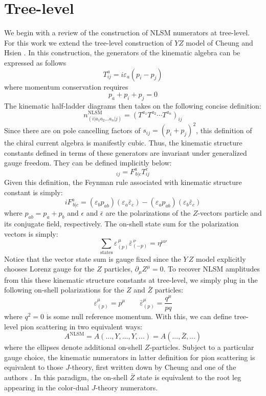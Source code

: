 \documentclass[12pt,letter]{article}
\def\be{\begin{equation}}
\def\ee{\end{equation}}
\begin{document}
\section{Tree-level}
We begin with a review of the construction of NLSM numerators at tree-level. For this work we extend the tree-level construction of $Y\!Z$ model of Cheung and Hsien \cite{Cheung2016prv}. In this construction, the generators of the kinematic algebra can be expressed as follows
\be\label{eq:FeynmanRuleYYZ}
T^a_{ij}= i \varepsilon_a(p_i-p_j)
\ee
where momentum conservation requires
\be
p_a + p_i + p_j =0
\ee
The kinematic half-ladder diagrams then takes on the following concise definition:
\be
n^{\text{NLSM}}_{(i|a_1a_2...a_n|j)} = (T^{a_1}T^{a_2}\cdots T^{a_n})_{ij}
\ee
Since there are on pole cancelling factors of $s_{ij} = (p_i+p_j)^2$, this definition of the chiral current algebra is manifestly cubic. Thus, the kinematic structure constants defined in terms of these generators are invariant under generalized gauge freedom. They can be defined implicitly below:
\be
[T^a,T^b]_{ij}= F^{a}_{\,b|c}T^c_{ij}
\ee
Given this definition, the Feynman rule associated with kinematic structure constant is simply:
\be\label{eq:FeynmanRuleXZZ}
i F^{a}_{\,b|c} = (\varepsilon_b p_{ab})(\varepsilon_a\bar{\varepsilon}_c) - (\varepsilon_a p_{ab})(\varepsilon_b\bar{\varepsilon}_c) 
\ee
where $p_{ab}=p_a+p_b$ and $\epsilon$ and $\bar{\epsilon}$ are the polarizations of the $Z$-vectors particle and its conjugate field, respectively. The on-shell state sum for the polarization vectors is simply:
\be
\sum_{\text{states}} \varepsilon^{\,\mu}_{(p)}\bar{\varepsilon}^{\,\nu}_{(-p)} = \eta^{\mu\nu}
\ee
Notice that the vector state sum is gauge fixed since the $Y\,Z$ model explicitly chooses Lorenz gauge for the $Z$ particles, $\partial_\mu Z^\mu=0$. To recover NLSM amplitudes from this these kinematic structure constants at tree-level, we simply plug in the following on-shell polarizations for the $Z$ and $\bar{Z}$ particles:
\be\label{eq:onShellZStates}
\varepsilon^\mu_{(p)} = p^\mu \qquad \bar{\varepsilon}^\mu_{(p)} = \frac{q^\mu}{pq}
\ee
where $q^2=0$ is some null reference momentum. With this, we can define tree-level pion scattering in two equivalent ways:
\be
A^{\text{NLSM}} = A(...,Y,...,Y,...) = A(...,\bar{Z},...) 
\ee
where the ellipses denote additional on-shell $Z$-particles. Subject to a particular gauge choice, the kinematic numerators in latter definition for pion scattering is equivalent to those $J$-theory, first written down by Cheung and one of the authors \cite{Cheung:2021zvb}. In this paradigm, the on-shell $\bar{Z}$ state is equivalent to the root leg appearing in the color-dual $J$-theory numerators. 
\end{document}
